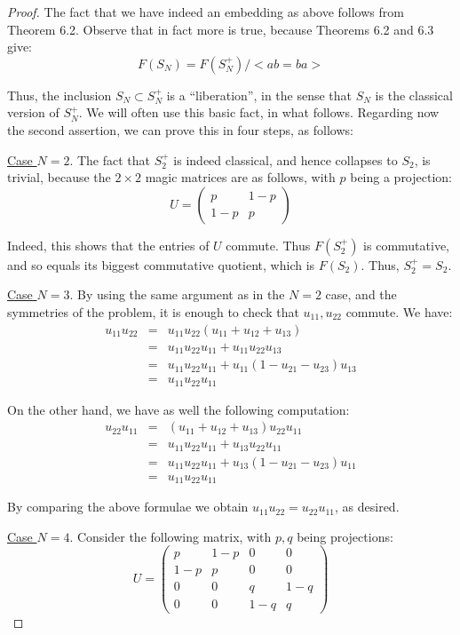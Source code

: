 \documentclass[12pt]{amsbook}
\begin{document}
\begin{proof}
The fact that we have indeed an embedding as above follows from Theorem 6.2. Observe that in fact more is true, because Theorems 6.2 and 6.3 give:
$$F(S_N)=F(S_N^+)\Big/\Big<ab=ba\Big>$$

Thus, the inclusion $S_N\subset S_N^+$ is a ``liberation'', in the sense that $S_N$ is the classical version of $S_N^+$. We will often use this basic fact, in what follows. Regarding now the second assertion, we can prove this in four steps, as follows:

\medskip

\underline{Case $N=2$}. The fact that $S_2^+$ is indeed classical, and hence collapses to $S_2$, is trivial, because the $2\times2$ magic matrices are as follows, with $p$ being a projection:
$$U=\begin{pmatrix}p&1-p\\1-p&p\end{pmatrix}$$

Indeed, this shows that the entries of $U$ commute. Thus $F(S_2^+)$ is commutative, and so equals its biggest commutative quotient, which is $F(S_2)$. Thus, $S_2^+=S_2$.

\medskip

\underline{Case $N=3$}. By using the same argument as in the $N=2$ case, and the symmetries of the problem, it is enough to check that $u_{11},u_{22}$ commute. We have:
\begin{eqnarray*}
u_{11}u_{22}
&=&u_{11}u_{22}(u_{11}+u_{12}+u_{13})\\
&=&u_{11}u_{22}u_{11}+u_{11}u_{22}u_{13}\\
&=&u_{11}u_{22}u_{11}+u_{11}(1-u_{21}-u_{23})u_{13}\\
&=&u_{11}u_{22}u_{11}
\end{eqnarray*}

On the other hand, we have as well the following computation:
\begin{eqnarray*}
u_{22}u_{11}
&=&(u_{11}+u_{12}+u_{13})u_{22}u_{11}\\
&=&u_{11}u_{22}u_{11}+u_{13}u_{22}u_{11}\\
&=&u_{11}u_{22}u_{11}+u_{13}(1-u_{21}-u_{23})u_{11}\\
&=&u_{11}u_{22}u_{11}
\end{eqnarray*}

By comparing the above formulae we obtain $u_{11}u_{22}=u_{22}u_{11}$, as desired.

\medskip

\underline{Case $N=4$}. Consider the following matrix, with $p,q$ being projections:
$$U=\begin{pmatrix}
p&1-p&0&0\\
1-p&p&0&0\\
0&0&q&1-q\\
0&0&1-q&q
\end{pmatrix}$$ 


\end{proof}
\end{document}
